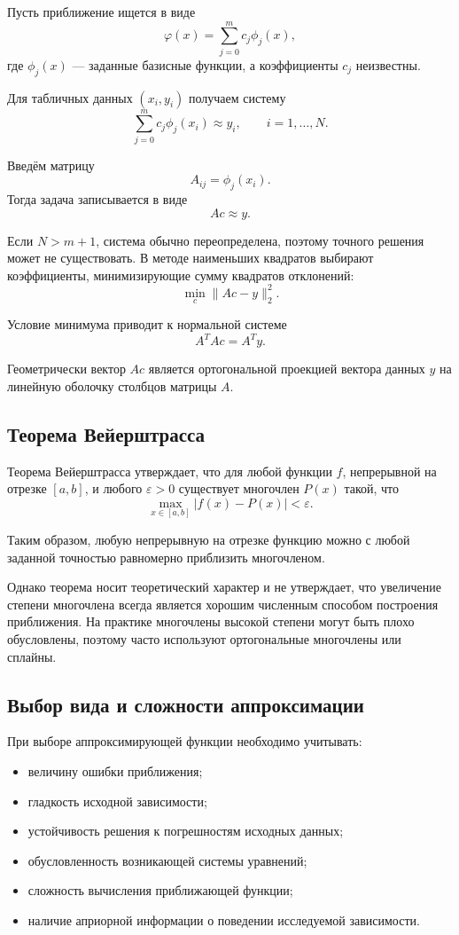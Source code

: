 Пусть приближение ищется в виде
\[
\varphi(x)
=
\sum_{j=0}^{m} c_j\phi_j(x),
\]
где $\phi_j(x)$ --- заданные базисные функции, а коэффициенты $c_j$ неизвестны.

Для табличных данных $(x_i,y_i)$ получаем систему
\[
\sum_{j=0}^{m}c_j\phi_j(x_i)\approx y_i,
\qquad
i=1,\ldots,N.
\]

Введём матрицу
\[
A_{ij}=\phi_j(x_i).
\]
Тогда задача записывается в виде
\[
Ac\approx y.
\]

Если $N>m+1$, система обычно переопределена, поэтому точного решения
может не существовать. В методе наименьших квадратов выбирают коэффициенты,
минимизирующие сумму квадратов отклонений:
\[
\min_c \|Ac-y\|_2^2.
\]

Условие минимума приводит к нормальной системе
\[
A^{T}Ac=A^{T}y.
\]

Геометрически вектор $Ac$ является ортогональной проекцией вектора данных
$y$ на линейную оболочку столбцов матрицы $A$.

\subsection{Теорема Вейерштрасса}

Теорема Вейерштрасса утверждает, что для любой функции $f$, непрерывной на отрезке $[a,b]$, и любого $\varepsilon>0$ существует многочлен $P(x)$ такой, что
\[
\max_{x\in[a,b]}|f(x)-P(x)|<\varepsilon.
\]

Таким образом, любую непрерывную на отрезке функцию можно с любой заданной точностью равномерно приблизить многочленом.

Однако теорема носит теоретический характер и не утверждает, что увеличение степени многочлена всегда является хорошим численным способом построения приближения. На практике многочлены высокой степени могут быть плохо обусловлены, поэтому часто используют ортогональные многочлены или сплайны.

\subsection{Выбор вида и сложности аппроксимации}

При выборе аппроксимирующей функции необходимо учитывать:
\begin{itemize}
	\item величину ошибки приближения;
	\item гладкость исходной зависимости;
	\item устойчивость решения к погрешностям исходных данных;
	\item обусловленность возникающей системы уравнений;
	\item сложность вычисления приближающей функции;
	\item наличие априорной информации о поведении исследуемой зависимости.
\end{itemize}

